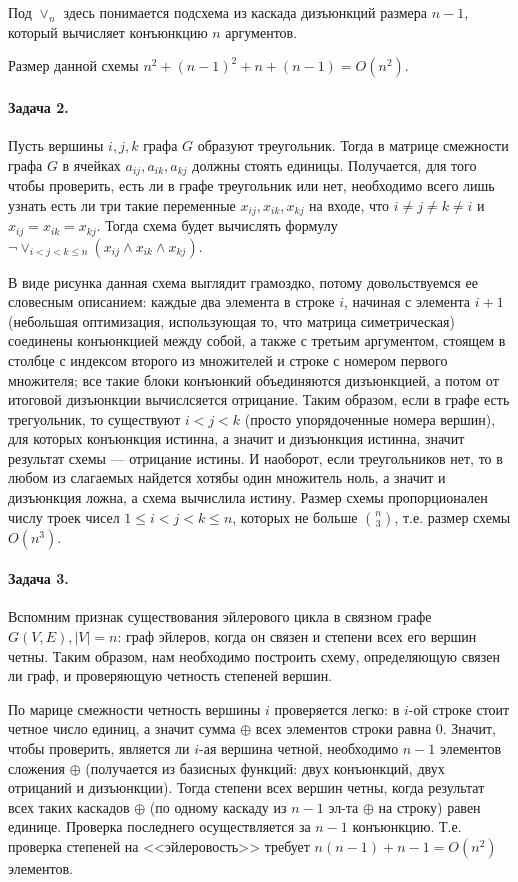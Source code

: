 \documentclass{article}
\begin{document}
    Под $\lor_n$ здесь понимается подсхема из каскада дизъюнкций размера $n - 1$, который вычисляет конъюнкцию $n$ аргументов.

    Размер данной схемы $n^2 + (n - 1)^2 + n + (n - 1) = O(n^2)$.

    \paragraph{Задача 2.}
    Пусть вершины $i, j, k$ графа $G$ образуют треугольник. Тогда в матрице смежности графа $G$ в ячейках $a_{ij}, a_{ik}, a_{kj}$ должны стоять единицы. Получается, для того чтобы проверить, есть ли в графе треугольник или нет, необходимо всего лишь узнать есть ли три такие переменные $x_{ij}, x_{ik}, x_{kj}$ на входе, что $i\ne j \ne k \ne i$ и $x_{ij}=x_{ik}=x_{kj}$. Тогда схема будет вычислять формулу $\neg\vee_{i<j<k \le n} (x_{ij}\land x_{ik}\land x_{kj})$. 

    В виде рисунка данная схема выглядит грамоздко, потому довольствуемся ее словесным описанием: каждые два элемента в строке $i$, начиная с элемента $i+1$ (небольшая оптимизация, использующая то, что матрица симетрическая) соединены конъюнкцией между собой, а также с третьим аргументом, стоящем в столбце с индексом второго из множителей и строке с номером первого множителя; все такие блоки конъюнкий объединяются дизъюнкцией, а потом от итоговой дизъюнкции вычислсяется отрицание. Таким образом, если в графе есть трегуольник, то существуют $i<j<k$ (просто упорядоченные номера вершин), для которых конъюнкция истинна, а значит и дизъюнкция истинна, значит результат схемы --- отрицание истины. И наоборот, если треугольников нет, то в любом из слагаемых найдется хотябы один множитель ноль, а значит и дизъюнкция ложна, а схема вычислила истину. Размер схемы пропорционален числу троек чисел $1 \le i < j < k \le n$, которых не больше ${n \choose 3}$, т.е. размер схемы $O(n^3)$.

    \paragraph{Задача 3.}
    Вспомним признак существования эйлерового цикла в связном графе $G(V, E), |V| = n$: граф эйлеров, когда он связен и степени всех его вершин четны. Таким образом, нам необходимо построить схему, определяющую связен ли граф, и проверяющую четность степеней вершин.

    По марице смежности четность вершины $i$ проверяется легко: в $i$-ой строке стоит четное число единиц, а значит сумма $\oplus$ всех элементов строки равна 0. Значит, чтобы проверить, является ли $i$-ая вершина четной, необходимо $n - 1$ элементов сложения $\oplus$ (получается из базисных функций: двух конъюнкций, двух отрицаний и дизъюнкции). Тогда степени всех вершин четны, когда результат всех таких каскадов $\oplus$ (по одному каскаду из $n - 1$ эл-та $\oplus$ на строку) равен единице. Проверка последнего осуществляется за $n - 1$ конъюнкцию. Т.е. проверка степеней на <<эйлеровость>> требует $n(n - 1) + n - 1 = O(n^2)$ элементов. 
\end{document}
